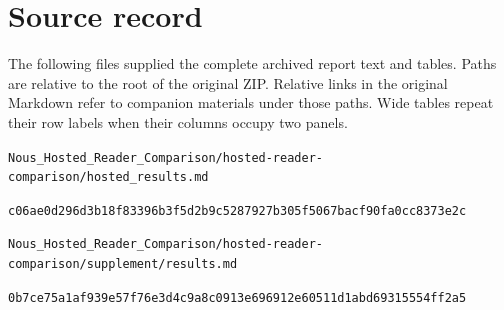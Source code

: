 \documentclass[11pt,letterpaper]{article}
\begin{document}
\section*{Source record}

The following files supplied the complete archived report text and tables. Paths are relative to the root of the original ZIP. Relative links in the original Markdown refer to companion materials under those paths. Wide tables repeat their row labels when their columns occupy two panels.

\noindent\nolinkurl{Nous_Hosted_Reader_Comparison/hosted-reader-comparison/hosted_results.md}\par

{\small\nolinkurl{c06ae0d296d3b18f83396b3f5d2b9c5287927b305f5067bacf90fa0cc8373e2c}}\par

\noindent\nolinkurl{Nous_Hosted_Reader_Comparison/hosted-reader-comparison/supplement/results.md}\par

{\small\nolinkurl{0b7ce75a1af939e57f76e3d4c9a8c0913e696912e60511d1abd69315554ff2a5}}\par
\end{document}
